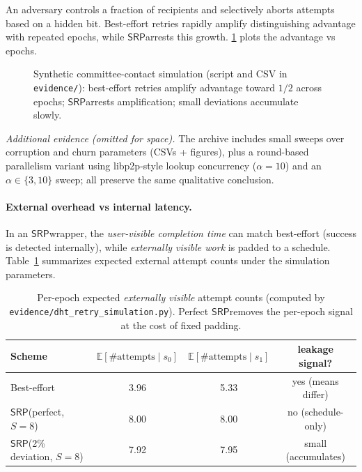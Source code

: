 \documentclass[11pt]{article}
\newcommand{\SRP}{\ensuremath{\mathsf{SRP}}}
\begin{document}
An adversary controls a fraction of recipients and selectively aborts attempts based on a hidden bit.
Best-effort retries rapidly amplify distinguishing advantage with repeated epochs, while \SRP arrests this growth.
\cref{fig:dhtsim} plots the advantage vs epochs.

\begin{figure}[t]
  \centering
  \caption{Synthetic committee-contact simulation (script and CSV in \texttt{evidence/}): best-effort retries amplify advantage toward $1/2$ across epochs; \SRP arrests amplification; small deviations accumulate slowly.}
  \label{fig:dhtsim}
\end{figure}

\noindent\emph{Additional evidence (omitted for space).} The archive includes small sweeps over corruption and churn parameters (CSVs + figures), plus a round-based parallelism variant using libp2p-style lookup concurrency ($\alpha=10$) and an $\alpha\in\{3,10\}$ sweep; all preserve the same qualitative conclusion.


\paragraph{External overhead vs internal latency.}
In an \SRP wrapper, the \emph{user-visible completion time} can match best-effort (success is detected internally),
while \emph{externally visible work} is padded to a schedule.
Table~\ref{tab:overhead} summarizes expected external attempt counts under the simulation parameters.

\begin{table}[t]
\centering
\begin{tabular}{@{}lccc@{}}
\toprule
Scheme & $\mathbb{E}[\#\text{attempts}\mid s_0]$ & $\mathbb{E}[\#\text{attempts}\mid s_1]$ & leakage signal? \\
\midrule
Best-effort & 3.96 & 5.33 & yes (means differ) \\
\SRP (perfect, $S{=}8$) & 8.00 & 8.00 & no (schedule-only) \\
\SRP (2\% deviation, $S{=}8$) & 7.92 & 7.95 & small (accumulates) \\
\bottomrule
\end{tabular}
\caption{Per-epoch expected \emph{externally visible} attempt counts (computed by \texttt{evidence/dht\_retry\_simulation.py}). Perfect \SRP removes the per-epoch signal at the cost of fixed padding.}
\label{tab:overhead}
\end{table}
\end{document}
